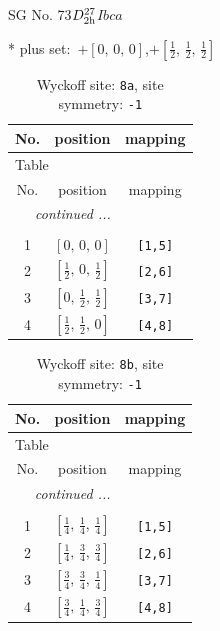 \documentclass[fleqn,8pt]{jsarticle}
\begin{document}
\setcounter{MaxMatrixCols}{32}

\renewcommand{\tablename}{Table~}
\renewcommand{\figurename}{Figure~}
\begin{center}
\LARGE
SG No. 73\quad$D_{\rm 2h}^{27}$\quad$Ibca$\quad[ orthorhombic ]
\end{center}
* plus set:\,\,\,$+\left[ 0,\, 0,\, 0 \right]$,\quad $+\left[ \frac{1}{2},\, \frac{1}{2},\, \frac{1}{2} \right]$
\renewcommand{\arraystretch}{1.2}
\begin{longtable}{ccc}
\caption{Wyckoff site: {\tt 8a}, site symmetry: {\tt -1}}
 \\
 \hline \hline
No. & position & mapping \\ \hline \endfirsthead

\multicolumn{2}{l}{\tablename\ \thetable{}} \\
 \hline \hline
No. & position & mapping \\ \hline \endhead

 \hline \hline
\multicolumn{2}{r}{\footnotesize\it continued ...} \\ \endfoot

 \hline \hline
\multicolumn{2}{r}{} \\ \endlastfoot

1 & $\left[ 0,\, 0,\, 0 \right]$ & {\tt [1,5]} \\ \hline
2 & $\left[ \frac{1}{2},\, 0,\, \frac{1}{2} \right]$ & {\tt [2,6]} \\ \hline
3 & $\left[ 0,\, \frac{1}{2},\, \frac{1}{2} \right]$ & {\tt [3,7]} \\ \hline
4 & $\left[ \frac{1}{2},\, \frac{1}{2},\, 0 \right]$ & {\tt [4,8]} \\
\end{longtable}
\renewcommand{\arraystretch}{1.2}
\begin{longtable}{ccc}
\caption{Wyckoff site: {\tt 8b}, site symmetry: {\tt -1}}
 \\
 \hline \hline
No. & position & mapping \\ \hline \endfirsthead

\multicolumn{2}{l}{\tablename\ \thetable{}} \\
 \hline \hline
No. & position & mapping \\ \hline \endhead

 \hline \hline
\multicolumn{2}{r}{\footnotesize\it continued ...} \\ \endfoot

 \hline \hline
\multicolumn{2}{r}{} \\ \endlastfoot

1 & $\left[ \frac{1}{4},\, \frac{1}{4},\, \frac{1}{4} \right]$ & {\tt [1,5]} \\ \hline
2 & $\left[ \frac{1}{4},\, \frac{3}{4},\, \frac{3}{4} \right]$ & {\tt [2,6]} \\ \hline
3 & $\left[ \frac{3}{4},\, \frac{3}{4},\, \frac{1}{4} \right]$ & {\tt [3,7]} \\ \hline
4 & $\left[ \frac{3}{4},\, \frac{1}{4},\, \frac{3}{4} \right]$ & {\tt [4,8]} \\
\end{longtable}
\end{document}

